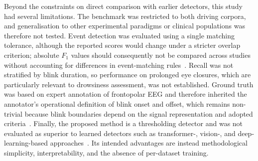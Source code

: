 
Beyond the constraints on direct comparison with earlier detectors, this study had several limitations. The benchmark was restricted to both driving corpora, and generalisation to other experimental paradigms or clinical populations was therefore not tested. Event detection was evaluated using a single matching tolerance, although the reported scores would change under a stricter overlap criterion; absolute $F_1$ values should consequently not be compared across studies without accounting for differences in event-matching rules~\citep{salles2024softed}. Recall was not stratified by blink duration, so performance on prolonged eye closures, which are particularly relevant to drowsiness assessment, was not established. Ground truth was based on expert annotation of frontopolar EEG and therefore inherited the annotator's operational definition of blink onset and offset, which remains non-trivial because blink boundaries depend on the signal representation and adopted criteria~\citep{nystrm2024what}. Finally, the proposed method is a thresholding detector and was not evaluated as superior to learned detectors such as transformer-, vision-, and deep-learning-based approaches~\citep{fodor2023blinklinmult,hong2024robust,egambaram2022investigation}. Its intended advantages are instead methodological simplicity, interpretability, and the absence of per-dataset training.
